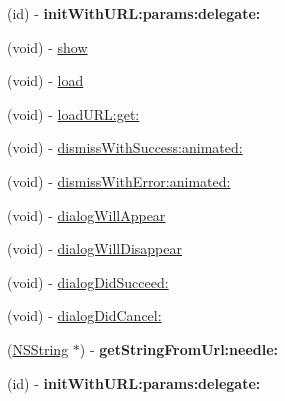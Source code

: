 \begin{DoxyCompactItemize}
\item 
\hypertarget{interface_f_b_dialog_aaf959b0fcd619b6b05e459983172b10c}{
(id) -\/ {\bfseries init\-With\-U\-R\-L\-:params\-:delegate\-:}}
\label{interface_f_b_dialog_aaf959b0fcd619b6b05e459983172b10c}

\item 
(void) -\/ \hyperlink{interface_f_b_dialog_a657a94d26c8dd3dfbe60b64c6bcbf411}{show}
\item 
(void) -\/ \hyperlink{interface_f_b_dialog_a41ca6458674d1701e6e1d143d5aeb972}{load}
\item 
(void) -\/ \hyperlink{interface_f_b_dialog_a3b32355179377b16579a427e221929f4}{load\-U\-R\-L\-:get\-:}
\item 
(void) -\/ \hyperlink{interface_f_b_dialog_a29fdcc8f0a52e8008b298743d5f7df49}{dismiss\-With\-Success\-:animated\-:}
\item 
(void) -\/ \hyperlink{interface_f_b_dialog_ab28580963cd61978da74492dabce054b}{dismiss\-With\-Error\-:animated\-:}
\item 
(void) -\/ \hyperlink{interface_f_b_dialog_ad0bfcbe959e7334d076079ce3288142d}{dialog\-Will\-Appear}
\item 
(void) -\/ \hyperlink{interface_f_b_dialog_a0aaf0151353b93b543525601f9d41a83}{dialog\-Will\-Disappear}
\item 
(void) -\/ \hyperlink{interface_f_b_dialog_a038587c0962d2dbda704f151d45eb6d3}{dialog\-Did\-Succeed\-:}
\item 
(void) -\/ \hyperlink{interface_f_b_dialog_a91e729bd79578cb130cf5256e1fb2b8e}{dialog\-Did\-Cancel\-:}
\item 
\hypertarget{interface_f_b_dialog_a30c3df8ccf10cc5735d1f7d2e992f984}{
(\hyperlink{class_n_s_string}{\-N\-S\-String} $\ast$) -\/ {\bfseries get\-String\-From\-Url\-:needle\-:}}
\label{interface_f_b_dialog_a30c3df8ccf10cc5735d1f7d2e992f984}

\item 
\hypertarget{interface_f_b_dialog_aaf959b0fcd619b6b05e459983172b10c}{
(id) -\/ {\bfseries init\-With\-U\-R\-L\-:params\-:delegate\-:}}
\label{interface_f_b_dialog_aaf959b0fcd619b6b05e459983172b10c}


\end{DoxyCompactItemize}
